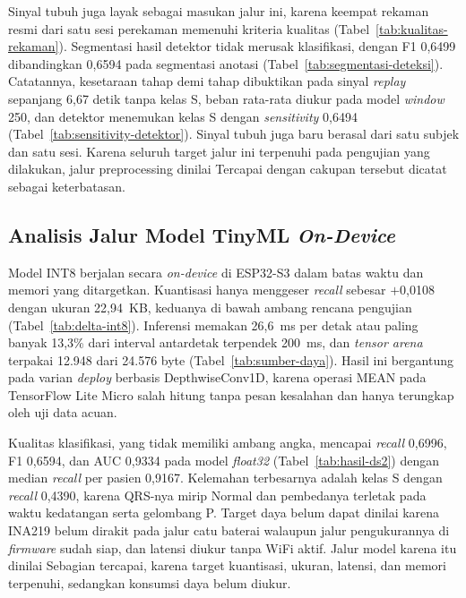 Sinyal tubuh juga layak sebagai masukan jalur ini, karena keempat rekaman resmi dari satu sesi perekaman memenuhi kriteria kualitas (Tabel~\ref{tab:kualitas-rekaman}). Segmentasi hasil detektor tidak merusak klasifikasi, dengan F1 0,6499 dibandingkan 0,6594 pada segmentasi anotasi (Tabel~\ref{tab:segmentasi-deteksi}). Catatannya, kesetaraan tahap demi tahap dibuktikan pada sinyal \textit{replay} sepanjang 6,67 detik tanpa kelas S, beban rata-rata diukur pada model \textit{window} 250, dan detektor menemukan kelas S dengan \textit{sensitivity} 0,6494 (Tabel~\ref{tab:sensitivity-detektor}). Sinyal tubuh juga baru berasal dari satu subjek dan satu sesi. Karena seluruh target jalur ini terpenuhi pada pengujian yang dilakukan, jalur preprocessing dinilai Tercapai dengan cakupan tersebut dicatat sebagai keterbatasan.

\subsection{Analisis Jalur Model TinyML \textit{On-Device}}

Model INT8 berjalan secara \textit{on-device} di ESP32-S3 dalam batas waktu dan memori yang ditargetkan. Kuantisasi hanya menggeser \textit{recall} sebesar $+$0,0108 dengan ukuran 22,94~KB, keduanya di bawah ambang rencana pengujian (Tabel~\ref{tab:delta-int8}). Inferensi memakan 26,6~ms per detak atau paling banyak 13,3\% dari interval antardetak terpendek 200~ms, dan \textit{tensor arena} terpakai 12.948 dari 24.576 byte (Tabel~\ref{tab:sumber-daya}). Hasil ini bergantung pada varian \textit{deploy} berbasis DepthwiseConv1D, karena operasi MEAN pada TensorFlow Lite Micro salah hitung tanpa pesan kesalahan dan hanya terungkap oleh uji data acuan.

Kualitas klasifikasi, yang tidak memiliki ambang angka, mencapai \textit{recall} 0,6996, F1 0,6594, dan AUC 0,9334 pada model \textit{float32} (Tabel~\ref{tab:hasil-ds2}) dengan median \textit{recall} per pasien 0,9167. Kelemahan terbesarnya adalah kelas S dengan \textit{recall} 0,4390, karena QRS-nya mirip Normal dan pembedanya terletak pada waktu kedatangan serta gelombang P. Target daya belum dapat dinilai karena INA219 belum dirakit pada jalur catu baterai walaupun jalur pengukurannya di \textit{firmware} sudah siap, dan latensi diukur tanpa WiFi aktif. Jalur model karena itu dinilai Sebagian tercapai, karena target kuantisasi, ukuran, latensi, dan memori terpenuhi, sedangkan konsumsi daya belum diukur.

